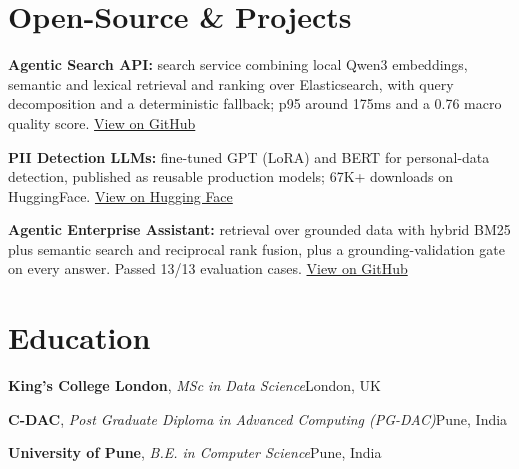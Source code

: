 \documentclass[10pt,a4paper]{article}
\begin{document}
\section{Open-Source \& Projects}
\begin{tight}
  \item \textbf{Agentic Search API:} search service combining local Qwen3 embeddings, semantic and lexical retrieval and ranking over Elasticsearch, with query decomposition and a deterministic fallback; p95 around 175ms and a 0.76 macro quality score. \href{https://github.com/abhijeetscode/search-agent}{View on GitHub}
  \item \textbf{PII Detection LLMs:} fine-tuned GPT (LoRA) and BERT for personal-data detection, published as reusable production models; 67K+ downloads on HuggingFace. \href{https://huggingface.co/ab-ai/pii_model}{View on Hugging Face}
  \item \textbf{Agentic Enterprise Assistant:} retrieval over grounded data with hybrid BM25 plus semantic search and reciprocal rank fusion, plus a grounding-validation gate on every answer. Passed 13/13 evaluation cases. \href{https://github.com/abhijeetscode/Agentic-Enterprise-Assistant}{View on GitHub}
\end{tight}

\section{Education}
{\color{company}\bfseries King's College London}, {\itshape MSc in Data Science}\hfill {\color{muted}London, UK}\par\vspace{2pt}
{\color{company}\bfseries C-DAC}, {\itshape Post Graduate Diploma in Advanced Computing (PG-DAC)}\hfill {\color{muted}Pune, India}\par\vspace{2pt}
{\color{company}\bfseries University of Pune}, {\itshape B.E. in Computer Science}\hfill {\color{muted}Pune, India}\par
\end{document}
